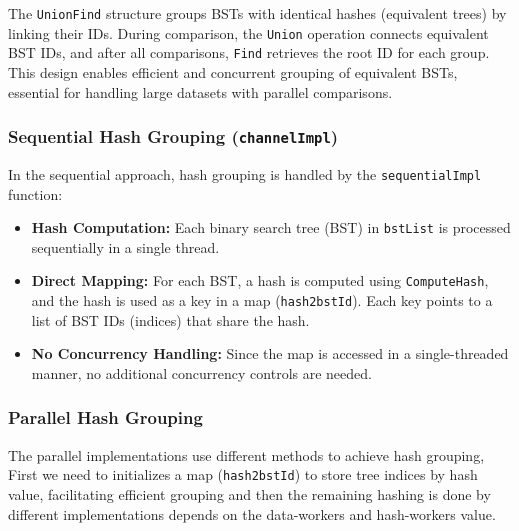 \documentclass[letterpaper,12pt]{article}
\theoremstyle{remark}
\begin{document}
The \texttt{UnionFind} structure groups BSTs with identical hashes (equivalent trees) by linking their IDs. During comparison, the \texttt{Union} operation connects equivalent BST IDs, and after all comparisons, \texttt{Find} retrieves the root ID for each group. This design enables efficient and concurrent grouping of equivalent BSTs, essential for handling large datasets with parallel comparisons.



\subsubsection{Sequential Hash Grouping (\texttt{channelImpl})}
In the sequential approach, hash grouping is handled by the \texttt{sequentialImpl} function:
\begin{itemize}
    \item \textbf{Hash Computation:} Each binary search tree (BST) in \texttt{bstList} is processed sequentially in a single thread.
    \item \textbf{Direct Mapping:} For each BST, a hash is computed using \texttt{ComputeHash}, and the hash is used as a key in a map (\texttt{hash2bstId}). Each key points to a list of BST IDs (indices) that share the hash.
    \item \textbf{No Concurrency Handling:} Since the map is accessed in a single-threaded manner, no additional concurrency controls are needed.
\end{itemize}




\subsubsection{Parallel Hash Grouping}
The parallel implementations use different methods to achieve hash grouping,
First we need to initializes a map (\texttt{hash2bstId}) to store tree indices by hash value, facilitating efficient grouping and then the remaining hashing is done by different implementations depends on the data-workers and hash-workers value.
  
    
    
\end{document}
